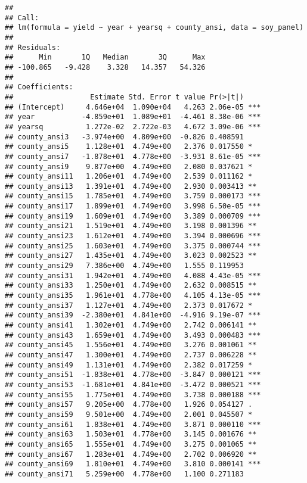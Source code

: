 \documentclass[
]{book}
\begin{document}
\begin{verbatim}
## 
## Call:
## lm(formula = yield ~ year + yearsq + county_ansi, data = soy_panel)
## 
## Residuals:
##      Min       1Q   Median       3Q      Max 
## -100.865   -9.428    3.328   14.357   54.326 
## 
## Coefficients:
##                  Estimate Std. Error t value Pr(>|t|)    
## (Intercept)     4.646e+04  1.090e+04   4.263 2.06e-05 ***
## year           -4.859e+01  1.089e+01  -4.461 8.38e-06 ***
## yearsq          1.272e-02  2.722e-03   4.672 3.09e-06 ***
## county_ansi3   -3.974e+00  4.809e+00  -0.826 0.408591    
## county_ansi5    1.128e+01  4.749e+00   2.376 0.017550 *  
## county_ansi7   -1.878e+01  4.778e+00  -3.931 8.61e-05 ***
## county_ansi9    9.877e+00  4.749e+00   2.080 0.037621 *  
## county_ansi11   1.206e+01  4.749e+00   2.539 0.011162 *  
## county_ansi13   1.391e+01  4.749e+00   2.930 0.003413 ** 
## county_ansi15   1.785e+01  4.749e+00   3.759 0.000173 ***
## county_ansi17   1.899e+01  4.749e+00   3.998 6.50e-05 ***
## county_ansi19   1.609e+01  4.749e+00   3.389 0.000709 ***
## county_ansi21   1.519e+01  4.749e+00   3.198 0.001396 ** 
## county_ansi23   1.612e+01  4.749e+00   3.394 0.000696 ***
## county_ansi25   1.603e+01  4.749e+00   3.375 0.000744 ***
## county_ansi27   1.435e+01  4.749e+00   3.023 0.002523 ** 
## county_ansi29   7.386e+00  4.749e+00   1.555 0.119953    
## county_ansi31   1.942e+01  4.749e+00   4.088 4.43e-05 ***
## county_ansi33   1.250e+01  4.749e+00   2.632 0.008515 ** 
## county_ansi35   1.961e+01  4.778e+00   4.105 4.13e-05 ***
## county_ansi37   1.127e+01  4.749e+00   2.373 0.017672 *  
## county_ansi39  -2.380e+01  4.841e+00  -4.916 9.19e-07 ***
## county_ansi41   1.302e+01  4.749e+00   2.742 0.006141 ** 
## county_ansi43   1.659e+01  4.749e+00   3.493 0.000483 ***
## county_ansi45   1.556e+01  4.749e+00   3.276 0.001061 ** 
## county_ansi47   1.300e+01  4.749e+00   2.737 0.006228 ** 
## county_ansi49   1.131e+01  4.749e+00   2.382 0.017259 *  
## county_ansi51  -1.838e+01  4.778e+00  -3.847 0.000121 ***
## county_ansi53  -1.681e+01  4.841e+00  -3.472 0.000521 ***
## county_ansi55   1.775e+01  4.749e+00   3.738 0.000188 ***
## county_ansi57   9.205e+00  4.778e+00   1.926 0.054127 .  
## county_ansi59   9.501e+00  4.749e+00   2.001 0.045507 *  
## county_ansi61   1.838e+01  4.749e+00   3.871 0.000110 ***
## county_ansi63   1.503e+01  4.778e+00   3.145 0.001676 ** 
## county_ansi65   1.555e+01  4.749e+00   3.275 0.001065 ** 
## county_ansi67   1.283e+01  4.749e+00   2.702 0.006920 ** 
## county_ansi69   1.810e+01  4.749e+00   3.810 0.000141 ***
## county_ansi71   5.259e+00  4.778e+00   1.100 0.271183    

\end{verbatim}
\end{document}
